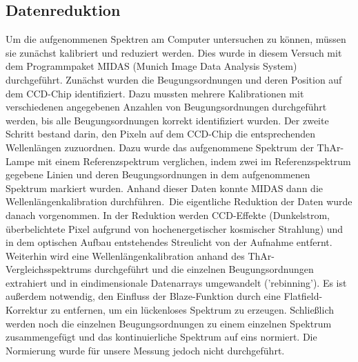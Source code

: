 \subsection{Datenreduktion}
Um die aufgenommenen Spektren am Computer untersuchen zu können, müssen sie zunächst kalibriert und reduziert werden. Dies wurde in diesem Versuch mit dem Programmpaket MIDAS (Munich Image Data Analysis System) durchgeführt. Zunächst wurden die Beugungsordnungen und deren Position auf dem CCD-Chip identifiziert. Dazu mussten mehrere Kalibrationen mit verschiedenen angegebenen Anzahlen von Beugungsordnungen durchgeführt werden, bis alle Beugungsordnungen korrekt identifiziert wurden. Der zweite Schritt bestand darin, den Pixeln auf dem CCD-Chip die entsprechenden Wellenlängen zuzuordnen. Dazu wurde das aufgenommene Spektrum der ThAr-Lampe mit einem Referenzspektrum verglichen, indem zwei im Referenzspektrum gegebene Linien und deren Beugungsordnungen in dem aufgenommenen Spektrum markiert wurden. Anhand dieser Daten konnte MIDAS dann die Wellenlängenkalibration durchführen.\
Die eigentliche Reduktion der Daten wurde danach vorgenommen. In der Reduktion werden CCD-Effekte (Dunkelstrom, überbelichtete Pixel aufgrund von hochenergetischer kosmischer Strahlung) und in dem optischen Aufbau entstehendes Streulicht von der Aufnahme entfernt. Weiterhin wird eine Wellenlängenkalibration anhand des ThAr-Vergleichsspektrums durchgeführt und die einzelnen Beugungsordnungen extrahiert und in eindimensionale Datenarrays umgewandelt ('rebinning'). Es ist außerdem notwendig, den Einfluss der Blaze-Funktion durch eine Flatfield-Korrektur zu entfernen, um ein lückenloses Spektrum zu erzeugen. Schließlich werden noch die einzelnen Beugungsordnungen zu einem einzelnen Spektrum zusammengefügt und das kontinuierliche Spektrum auf eins normiert. Die Normierung wurde für unsere Messung jedoch nicht durchgeführt.  